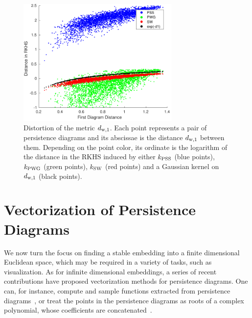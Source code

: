 \begin{figure}\centering
\includegraphics[width=8cm]{figures/distance/distances.pdf}
\caption[Metric distortion]{\label{fig:Airplanedistances} Distortion of the metric $d_{{\rm w},1}$.
Each point represents a pair of persistence diagrams and its abscissae is the distance $d_{{\rm w},1}$ between them. 
Depending on the point color, its ordinate is the logarithm of the distance in the RKHS induced by either
$k_{\rm PSS}$ (blue points), $k_{\rm PWG}$ (green points), $k_{\rm SW}$ (red points) and a Gaussian kernel on $d_{{\rm w},1}$ (black points).  }
\end{figure}




































\section{Vectorization of Persistence Diagrams}
\label{sec:VectorPDs}

We now turn the focus on finding a stable embedding into a finite dimensional Euclidean space,
which may be required in a variety of tasks, such as visualization.  
As for infinite dimensional embeddings, a series of recent contributions have proposed vectorization 
methods for persistence diagrams.
One can, for instance, compute and sample functions extracted from
persistence diagrams~\cite{Adams17,Bubenik15,Robins16}, or treat the
points in the persistence diagrams as roots of a complex polynomial, whose coefficients are
concatenated~\cite{diFabio15}.

